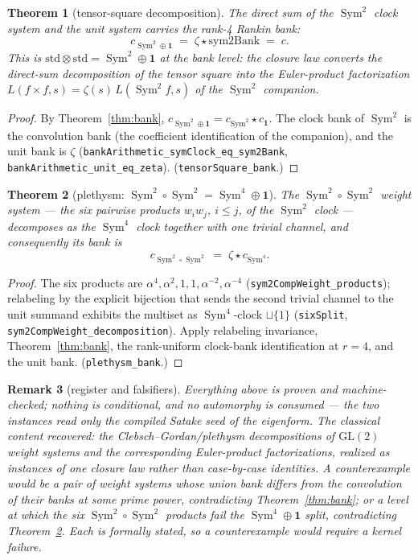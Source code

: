 \documentclass[11pt]{article}
\newtheorem{theorem}{Theorem}
\newtheorem{remark}[theorem]{Remark}
\newcommand{\Sym}{\operatorname{Sym}}
\begin{document}
\begin{theorem}[tensor-square decomposition]\label{thm:tensor}
The direct sum of the $\Sym^2$ clock system and the unit system carries the rank-4 Rankin
bank:
\[
  c_{\Sym^2\oplus\mathbf 1}\;=\;\zeta\star\mathrm{sym2Bank}\;=\;c .
\]
This is $\mathrm{std}\otimes\mathrm{std}=\Sym^2\oplus\mathbf 1$ at the bank level: the
closure law converts the direct-sum decomposition of the tensor square into the Euler-product
factorization $L(f\times f,s)=\zeta(s)\,L(\Sym^2\!f,s)$ of the $\Sym^2$ companion.
\end{theorem}
\begin{proof}
By Theorem~\ref{thm:bank}, $c_{\Sym^2\oplus\mathbf 1}=c_{\Sym^2}\star c_{\mathbf 1}$.  The
clock bank of $\Sym^2$ is the convolution bank (the coefficient identification of the
companion), and the unit bank is $\zeta$
(\texttt{bankArithmetic\_symClock\_eq\_sym2Bank}, \texttt{bankArithmetic\_unit\_eq\_zeta}).
(\texttt{tensorSquare\_bank}.)
\end{proof}

\begin{theorem}[plethysm: $\Sym^2\circ\Sym^2=\Sym^4\oplus\mathbf 1$]\label{thm:plethysm}
The $\Sym^2\!\circ\Sym^2$ weight system --- the six pairwise products
$w_iw_j$, $i\le j$, of the $\Sym^2$ clock --- decomposes as the $\Sym^4$ clock together with
one trivial channel, and consequently its bank is
\[
  c_{\Sym^2\circ\Sym^2}\;=\;\zeta\star c_{\Sym^4}.
\]
\end{theorem}
\begin{proof}
The six products are $\alpha^4,\alpha^2,1,1,\alpha^{-2},\alpha^{-4}$
(\texttt{sym2CompWeight\_products}); relabeling by the explicit bijection that sends the
second trivial channel to the unit summand exhibits the multiset as
$\Sym^4$-clock $\sqcup\{1\}$ (\texttt{sixSplit}, \texttt{sym2CompWeight\_decomposition}).
Apply relabeling invariance, Theorem~\ref{thm:bank}, the rank-uniform clock-bank
identification at $r=4$, and the unit bank.  (\texttt{plethysm\_bank}.)
\end{proof}

\begin{remark}[register and falsifiers]
Everything above is proven and machine-checked; nothing is conditional, and no automorphy is
consumed --- the two instances read only the compiled Satake seed of the eigenform.  The
classical content recovered: the Clebsch--Gordan/plethysm decompositions of $\mathrm{GL}(2)$
weight systems and the corresponding Euler-product factorizations, realized as instances of
one closure law rather than case-by-case identities.  A counterexample would be a pair of
weight systems whose union bank differs from the convolution of their banks at some prime
power, contradicting Theorem~\ref{thm:bank}; or a level at which the six $\Sym^2\circ\Sym^2$
products fail the $\Sym^4\oplus\mathbf 1$ split, contradicting
Theorem~\ref{thm:plethysm}.  Each is formally stated, so a counterexample would require a
kernel failure.
\end{remark}
\end{document}
